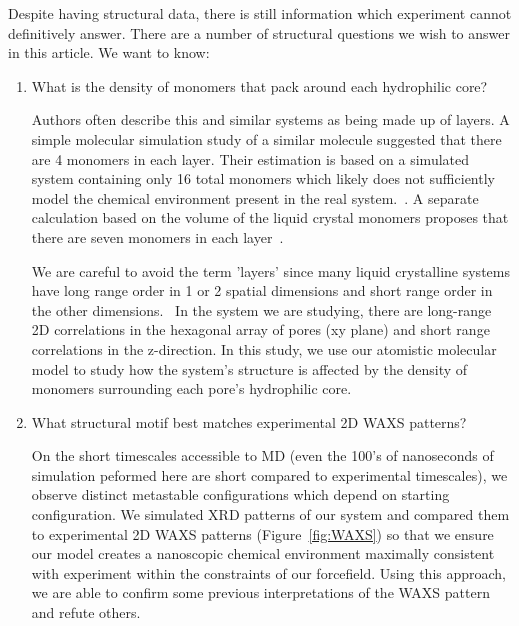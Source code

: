 \documentclass[journal=jpcbfk,manusciprt=article]{achemso}
\begin{document}
  Despite having structural data, there is still information which experiment cannot
  definitively answer. There are a number of structural questions we wish to answer in this 
  article. We want to know:
  \begin{enumerate}
    \item What is the density of monomers that pack around each hydrophilic core? 
    \label{point:monomernum}

 	Authors often describe this and similar systems as being made up of layers. A simple
 	molecular simulation study of a similar molecule suggested that there are 4 monomers
 	in each layer. Their estimation is based on a simulated system containing only 16 total
 	monomers which likely does not sufficiently model the chemical environment present in
 	the real system.~\cite{zhu_methacrylated_2006}. A separate calculation based on the 
 	volume of the liquid crystal monomers proposes that there are seven monomers in each 
 	layer~\cite{resel_structural_2000}. 

 	We are careful to avoid the term 'layers' since many liquid crystalline systems
 	have long range order in 1 or 2 spatial dimensions and short range order in 	
 	the other dimensions.~\cite{chaikin_principles_1995}  %
 	In the system we are studying, there are long-range 2D correlations in the 
 	hexagonal array of pores (xy plane) and short range correlations in the z-direction.
    In this study, we use our atomistic molecular model to study how the system's structure is 
    affected by the density of monomers surrounding each pore's hydrophilic core. 

	\item What structural motif best matches experimental 2D WAXS patterns?\label{point:xrdmatch}

	On the short timescales accessible to MD (even the 100's of nanoseconds of simulation 
	peformed here are short compared to experimental timescales), we observe distinct metastable
	configurations which depend on starting configuration. We simulated XRD patterns of our system and 
	compared them to experimental 2D WAXS patterns (Figure~\ref{fig:WAXS}) so that we ensure our
	model creates a nanoscopic chemical environment maximally consistent with experiment within 
	the constraints	of our forcefield. Using this approach, we are able to confirm some previous
	interpretations	of the WAXS pattern and refute others. 
	

\end{enumerate}
\end{document}
